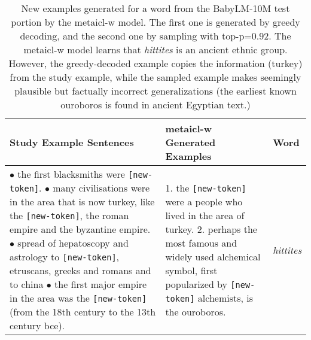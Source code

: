 \documentclass{article}
\begin{document}
\begin{table*}[t]
\small
\begin{center}
\begin{tabular}{p{8cm}p{4.3cm}p{0.8cm}}
\toprule
\textbf{Study Example Sentences} & \textbf{\ac{metaicl-w} Generated Examples} & \textbf{Word} \\
\midrule
$\bullet$ the first blacksmiths were \texttt{[new-token]}.
$\bullet$ many civilisations were in the area that is now turkey, like the \texttt{[new-token]}, the roman empire and the byzantine empire.
$\bullet$ spread of hepatoscopy and astrology to \texttt{[new-token]}, etruscans, greeks and romans and to china
$\bullet$ the first major empire in the area was the \texttt{[new-token]} (from the 18th century to the 13th century bce).
&
1. the \texttt{[new-token]} were a people who lived in the area of turkey.
2. perhaps the most famous and widely used alchemical symbol, first popularized by \texttt{[new-token]} alchemists, is the ouroboros.
& \textit{hittites}
\\
\bottomrule
\end{tabular}
\end{center}
\caption{New examples generated for a word from the BabyLM-10M test portion by the \ac{metaicl-w} model. The first one is generated by greedy decoding, and the second one by sampling with top-p=$0.92$.
The \ac{metaicl-w} model learns that \emph{hittites} is an ancient ethnic group. However, the greedy-decoded example copies the information (turkey) from the study example, while the sampled example makes seemingly plausible but factually incorrect generalizations (the earliest known ouroboros is found in ancient Egyptian text.)
}
\label{tab:babylm-generation-brief}
\end{table*}
\end{document}
